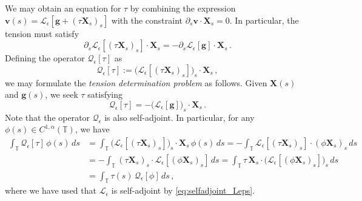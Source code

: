 \documentclass[11pt,reqno]{amsart}
\newcommand{\T}{\mathbb{T}}
\newcommand{\X}{\bm{X}}
\newcommand{\bv}{\bm{v}}
\newcommand{\p}{\partial}
\newcommand{\mc}[1]{\mathcal{#1}}
\theoremstyle{definition}
\begin{document}
We may obtain an equation for $\tau$ by combining the expression $\bv(s)=\mc{L}_\epsilon[\bm{g}+(\tau\X_s)_s]$ with the constraint $\p_s\bv\cdot\X_s=0$. In particular, the tension must satisfy
\begin{equation}\label{eq:tension_rel}
\p_s\mc{L}_\epsilon[(\tau\X_s)_s]\cdot\X_s = -\p_s\mc{L}_\epsilon[\bm{g}]\cdot\X_s \,.
\end{equation}
%
%
Defining the operator $\mc{Q}_\epsilon[\tau]$ as
\begin{equation}\label{eq:Qeps}
\mc{Q}_\epsilon[\tau] :=\big(\mc{L}_\epsilon[(\tau\X_s)_s]\big)_s\cdot\X_s\,,
\end{equation}
we may formulate the \emph{tension determination problem} as follows. Given $\X(s)$ and $\bm{g}(s)$, we seek $\tau$ satisfying 
\begin{equation}\label{eq:TDP}
\mc{Q}_\epsilon[\tau] = -\big(\mc{L}_\epsilon[\bm{g}]\big)_s\cdot\X_s\,.
\end{equation}
%
%
Note that the operator $\mc{Q}_\epsilon$ is also self-adjoint. In particular, for any $\phi(s)\in C^{1,\alpha}(\T)$, we have
\begin{equation}
\begin{aligned}
  \int_{\T} \mc{Q}_\epsilon[\tau]\,\phi(s)\,ds &= \int_{\T} \big(\mc{L}_\epsilon[(\tau\X_s)_s]\big)_s\cdot\X_s\,\phi(s)\,ds 
  = -\int_{\T} \mc{L}_\epsilon[(\tau\X_s)_s]\cdot(\phi\X_s)_s\,ds \\
  &= -\int_{\T} (\tau\X_s)_s\cdot\mc{L}_\epsilon[(\phi\X_s)_s]\,ds
  = \int_{\T} \tau\,\X_s\cdot\big(\mc{L}_\epsilon[(\phi\X_s)_s]\big)_s\,ds\\
  &= \int_\T \tau(s)\,\mc{Q}_\epsilon[\phi]\,ds\,,
\end{aligned}
\end{equation}
where we have used that $\mc{L}_\epsilon$ is self-adjoint by \eqref{eq:selfadjoint_Leps}.
\end{document}

